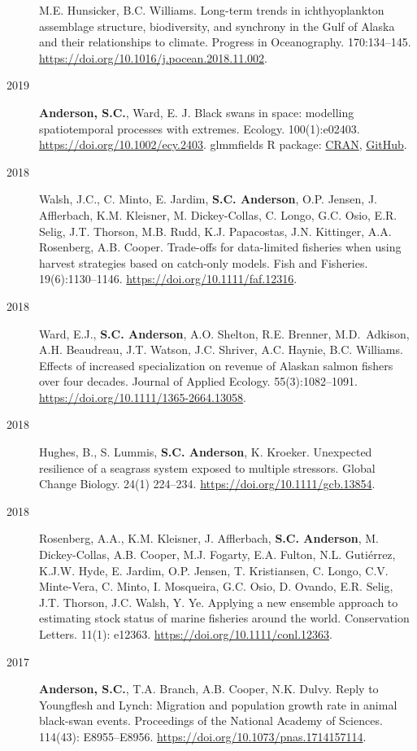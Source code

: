 \begin{description}
M.E. Hunsicker, B.C. Williams. Long-term trends in ichthyoplankton
assemblage structure, biodiversity, and synchrony in the Gulf of Alaska
and their relationships to climate. Progress in Oceanography.
170:134--145. \url{https://doi.org/10.1016/j.pocean.2018.11.002}.
\item[2019]
\textbf{Anderson, S.C.}, Ward, E. J. Black swans in space: modelling
spatiotemporal processes with extremes. Ecology. 100(1):e02403.
\url{https://doi.org/10.1002/ecy.2403}. glmmfields R package:
\href{https://cran.r-project.org/package=glmmfields}{CRAN},
\href{https://github.com/seananderson/glmmfields}{GitHub}.
\item[2018]
Walsh, J.C., C. Minto, E. Jardim, \textbf{S.C. Anderson}, O.P. Jensen,
J. Afflerbach, K.M. Kleisner, M. Dickey-Collas, C. Longo, G.C. Osio,
E.R. Selig, J.T. Thorson, M.B. Rudd, K.J. Papacostas, J.N. Kittinger,
A.A. Rosenberg, A.B. Cooper. Trade-offs for data-limited fisheries when
using harvest strategies based on catch-only models. Fish and Fisheries.
19(6):1130--1146. \url{https://doi.org/10.1111/faf.12316}.
\item[2018]
Ward, E.J., \textbf{S.C. Anderson}, A.O. Shelton, R.E. Brenner,
M.D.\ Adkison, A.H. Beaudreau, J.T. Watson, J.C. Shriver, A.C. Haynie,
B.C. Williams. Effects of increased specialization on revenue of Alaskan
salmon fishers over four decades. Journal of Applied Ecology.
55(3):1082--1091. \url{https://doi.org/10.1111/1365-2664.13058}.
\item[2018]
Hughes, B., S. Lummis, \textbf{S.C. Anderson}, K. Kroeker. Unexpected
resilience of a seagrass system exposed to multiple stressors. Global
Change Biology. 24(1) 224--234. \url{https://doi.org/10.1111/gcb.13854}.
\item[2018]
Rosenberg, A.A., K.M. Kleisner, J. Afflerbach, \textbf{S.C. Anderson},
M. Dickey-Collas, A.B. Cooper, M.J. Fogarty, E.A. Fulton, N.L.
Gutiérrez, K.J.W. Hyde, E. Jardim, O.P. Jensen, T. Kristiansen, C.
Longo, C.V. Minte-Vera, C. Minto, I. Mosqueira, G.C. Osio, D. Ovando,
E.R. Selig, J.T. Thorson, J.C. Walsh, Y. Ye. Applying a new ensemble
approach to estimating stock status of marine fisheries around the
world. Conservation Letters. 11(1): e12363.
\url{https://doi.org/10.1111/conl.12363}.
\item[2017]
\textbf{Anderson, S.C.}, T.A. Branch, A.B. Cooper, N.K. Dulvy. Reply to
Youngflesh and Lynch: Migration and population growth rate in animal
black-swan events. Proceedings of the National Academy of Sciences.
114(43): E8955--E8956. \url{https://doi.org/10.1073/pnas.1714157114}.

\end{description}

